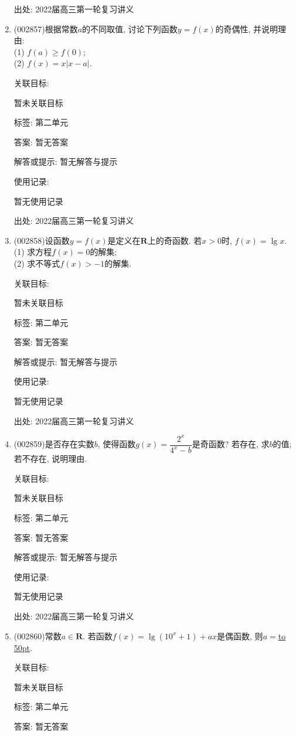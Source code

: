 \documentclass[10pt,a4paper]{article}
\newcommand{\blank}[1]{\underline{\hbox to #1pt{}}}
\begin{document}
\begin{enumerate}[1.]
出处: 2022届高三第一轮复习讲义
\item { (002857)}根据常数$a$的不同取值, 讨论下列函数$y=f(x)$的奇偶性, 并说明理由:\\
(1) $f(a)\ge f(0)$;\\
(2) $f(x)=x|x-a|$.


关联目标:

暂未关联目标



标签: 第二单元

答案: 暂无答案

解答或提示: 暂无解答与提示

使用记录:

暂无使用记录


出处: 2022届高三第一轮复习讲义
\item { (002858)}设函数$y=f(x)$是定义在$\mathbf{R}$上的奇函数. 若$x>0$时, $f(x)=\lg x$.\\
(1) 求方程$f(x)=0$的解集;\\
(2) 求不等式$f(x)>-1$的解集.


关联目标:

暂未关联目标



标签: 第二单元

答案: 暂无答案

解答或提示: 暂无解答与提示

使用记录:

暂无使用记录


出处: 2022届高三第一轮复习讲义
\item { (002859)}是否存在实数$b$, 使得函数$g(x)=\dfrac{2^x}{{4^x}-b}$是奇函数? 若存在, 求$b$的值; 若不存在, 说明理由.


关联目标:

暂未关联目标



标签: 第二单元

答案: 暂无答案

解答或提示: 暂无解答与提示

使用记录:

暂无使用记录


出处: 2022届高三第一轮复习讲义
\item { (002860)}常数$a\in \mathbf{R}$. 若函数$f(x)=\lg(10^x+1)+ax$是偶函数, 则$a=$\blank{50}.


关联目标:

暂未关联目标



标签: 第二单元

答案: 暂无答案


\end{enumerate}
\end{document}
